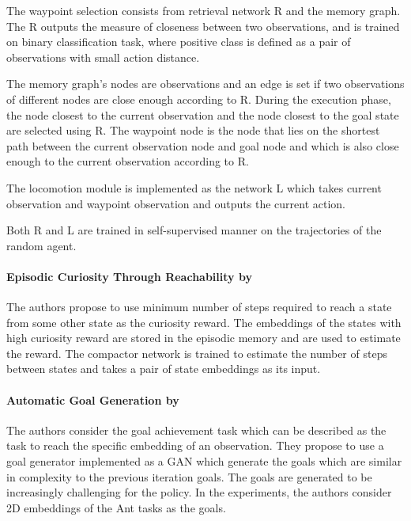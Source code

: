 \documentclass[acmsmall, nonacm]{acmart}
\begin{document}
The waypoint selection consists from retrieval network R and the memory graph. The R outputs the measure of closeness between two observations, and is trained on binary classification task, where positive class is defined as a pair of observations with small action distance.

The memory graph's nodes are observations and an edge is set if two observations of different nodes are close enough according to R. During the execution phase, the node closest to the current observation and the node closest to the goal state are selected using R. The waypoint node is the node that lies on the shortest path between the current observation node and goal node and which is also close enough to the current observation according to R.

The locomotion module is implemented as the network L which takes current observation and waypoint observation and outputs the current action.

Both R and L are trained in self-supervised manner on the trajectories of the random agent.


\paragraph{Episodic Curiosity Through Reachability by \citet{savinov2018episodic}}

The authors propose to use minimum number of steps required to reach a state from some other state as the curiosity reward. The embeddings of the states with high curiosity reward are stored in the episodic memory and are used to estimate the reward. The compactor network is trained to estimate the number of steps between states and takes a pair of state embeddings as its input.


\paragraph{Automatic Goal Generation by \citet{pmlr-v80-florensa18a}}

The authors consider the goal achievement task which can be described as the task to reach the specific embedding of an observation. They propose to use a goal generator implemented as a GAN which generate the goals which are similar in complexity to the previous iteration goals. The goals are generated to be increasingly challenging for the policy. In the experiments, the authors consider 2D embeddings of the Ant tasks as the goals.
\end{document}
